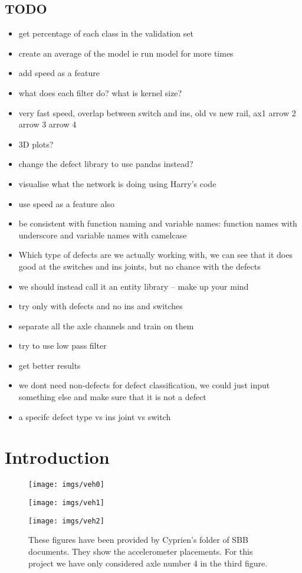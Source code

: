 \section{TODO}
\begin{itemize}
	\item get percentage of each class in the validation set
	\item create an average of the model ie run model for more times
	\item add speed as a feature
	\item what does each filter do? what is kernel size?
	\item very fast speed, overlap between switch and ins, old vs new rail, ax1 arrow 2 arrow 3 arrow 4
	\item 3D plots?
	\item change the defect library to use pandas instead?
	\item visualise what the network is doing using Harry's code
	\item use speed as a feature also
	\item be consistent with function naming and variable names: function names with underscore and variable names with camelcase
	\item Which type of defects are we actually working with, we can see that it does good at the switches and ins joints, but no chance with the defects
	\item we should instead call it an entity library -- make up your mind
	\item try only with defects and no ins and switches
	\item separate all the axle channels and train on them
	\item try to use low pass filter
	\item get better results
	\item we dont need non-defects for defect classification, we could just input something else and make sure that it is not a defect
	\item a specifc defect type vs ins joint vs switch
\end{itemize}



\newpage
\cleardoublepage
\appendix
\chapter{Introduction}
\label{figs:veh}
%
\begin{figure}[H]
	\centering
	\texttt{[image: imgs/veh0]}
	\label{fig:veh0}
	
	\texttt{[image: imgs/veh1]}
	\label{fig:veh1}
	
	\texttt{[image: imgs/veh2]}
	\caption{These figures have been provided by Cyprien's folder of SBB documents. They show the accelerometer placements. For this project we have only considered axle number 4 in the third figure.}
	\label{fig:veh2}
\end{figure}


